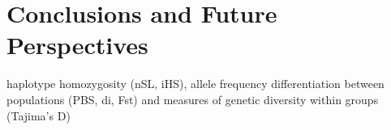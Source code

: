 
\chapter{Conclusions and Future Perspectives }%

\label{Chapter6} %


 
 
haplotype homozygosity (nSL, iHS), allele
frequency differentiation between populations (PBS, di, Fst) and measures of genetic
diversity within groups (Tajima’s D)
 